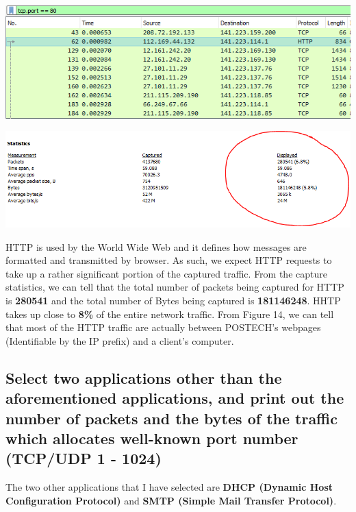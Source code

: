 \documentclass[a4paper,11pt]{article}
\begin{document}
\begin{enumerate}
\begin{minipage}{3in}
	\centering
		\includegraphics[width = 16cm]{httpfilter}
		\captionsetup{justification=centering}
	\end{minipage}
	\newline\newline
	\begin{minipage}{5in}
	\centering
		\includegraphics[width = 16cm]{httppacketsnbytes}
		\captionsetup{justification=centering}
	\end{minipage}
	\newline\newline
	HTTP is used by the World Wide Web and it defines how messages are formatted and transmitted by browser. As such, we expect HTTP requests to take up a rather significant portion of the captured traffic. From the capture statistics, we can tell that the total number of packets being captured for HTTP is \textbf{280541} and the total number of Bytes being captured is \textbf{181146248}. HHTP takes up close to \textbf{8\%} of the entire network traffic. From Figure 14, we can tell that most of the HTTP traffic are actually between POSTECH's webpages (Identifiable by the IP prefix) and a client's computer. \newline
\end{enumerate}
\subsection{Select  two  applications  other  than  the  aforementioned  applications,  and  print  out  the  number  of packets and the bytes of the traffic which allocates well-known  port  number  (TCP/UDP 1 - 1024) }
The two other applications that I have selected are \textbf{DHCP (Dynamic Host Configuration Protocol)} and \textbf{SMTP (Simple Mail Transfer Protocol)}.
\end{document}

